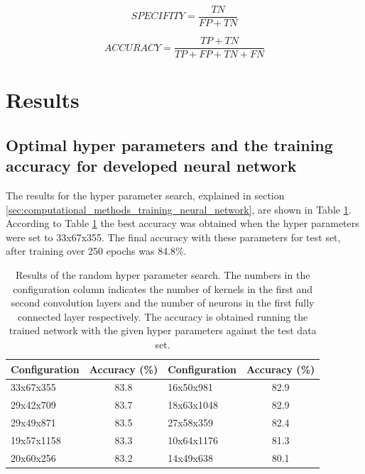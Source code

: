 \documentclass[aps,prb,10pt,twocolumn,groupedaddress]{revtex4-1}
\begin{document}
\begin{equation}
	SPECIFITY = \frac{TN}{FP + TN}
	\label{eq:specifity}
\end{equation}

\begin{equation}
	ACCURACY = \frac{TP + TN}{TP + FP + TN + FN}
\end{equation}



\section{Results}
\label{sec:results}
\subsection{Optimal hyper parameters and the training accuracy for developed neural network}
\label{sec:results_training}
The results for the hyper parameter search, explained in section \ref{sec:computational_methods_training_neural_network}, are shown in Table \ref{tab:hyperparameter_searach_accuracies}. According to Table \ref{tab:hyperparameter_searach_accuracies} the best accuracy was obtained when the hyper parameters were set to 33x67x355. The final accuracy with these parameters for test set, after training over 250 epochs was 84.8\%.
\begin{center}
	\begin{table}[h]
		\begin{tabular*}{0.45\textwidth}{lclc}
			Configuration & Accuracy (\%) & Configuration & Accuracy (\%)\\
			\hline
			33x67x355 & 83.8 & 16x50x981 & 82.9\\
			29x42x709 & 83.7 & 18x63x1048 & 82.9\\
			29x49x871 & 83.5 & 27x58x359 & 82.4\\
			19x57x1158 & 83.3 & 10x64x1176 & 81.3\\
			20x60x256 & 83.2 & 14x49x638 & 80.1\\
		\end{tabular*}
		\caption{Results of the random hyper parameter search. The numbers in the configuration column indicates the number of kernels in the first and second convolution layers and the number of neurons in the first fully connected layer respectively. The accuracy is obtained running the trained network with the given hyper parameters against the test data set.}
		\label{tab:hyperparameter_searach_accuracies}
	\end{table}
\end{center}
\end{document}
